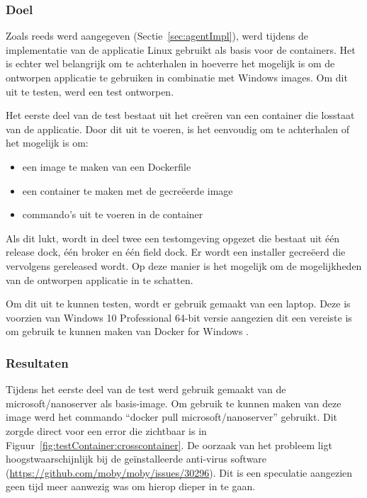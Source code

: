 \subsubsection{Doel}
Zoals reeds werd aangegeven (Sectie~\ref{sec:agentImpl}), werd tijdens de implementatie van de applicatie Linux gebruikt als basis voor de containers.
Het is echter wel belangrijk om te achterhalen in hoeverre het mogelijk is om de ontworpen applicatie te gebruiken in combinatie met Windows images.
Om dit uit te testen, werd een test ontworpen.

Het eerste deel van de test bestaat uit het creëren van een container die losstaat van de applicatie.
Door dit uit te voeren, is het eenvoudig om te achterhalen of het mogelijk is om:
\begin{itemize}
\item een image te maken van een Dockerfile
\item een container te maken met de gecreëerde image
\item commando's uit te voeren in de container
\end{itemize}
Als dit lukt, wordt in deel twee een testomgeving opgezet die bestaat uit één release dock, één broker en één field dock.
Er wordt een installer gecreëerd die vervolgens gereleased wordt.
Op deze manier is het mogelijk om de mogelijkheden van de ontworpen applicatie in te schatten.

Om dit uit te kunnen testen, wordt er gebruik gemaakt van een laptop.
Deze is voorzien van Windows 10 Professional 64-bit versie aangezien dit een vereiste is om gebruik te kunnen maken van Docker for Windows \citep{dockerWindows}.

\subsubsection{Resultaten}
Tijdens het eerste deel van de test werd gebruik gemaakt van de microsoft/nanoserver als basis-image.
Om gebruik te kunnen maken van deze image werd het commando ``docker pull microsoft/nanoserver'' gebruikt.
Dit zorgde direct voor een error die zichtbaar is in Figuur~\ref{fig:testContainer:crosscontainer}.
De oorzaak van het probleem ligt hoogstwaarschijnlijk bij de geïnstalleerde anti-virus software (\url{https://github.com/moby/moby/issues/30296}).
Dit is een speculatie aangezien geen tijd meer aanwezig was om hierop dieper in te gaan.

